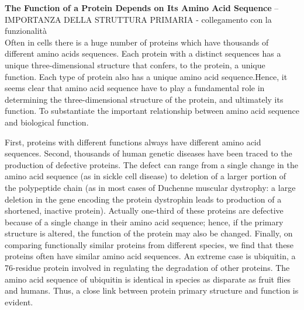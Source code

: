 \textbf{The Function of a Protein Depends on Its Amino Acid Sequence} -- IMPORTANZA DELLA STRUTTURA PRIMARIA - collegamento con la funzionalità\\
Often in cells there is a huge number of proteins which have thousands of different amino acids sequences. Each protein with a distinct sequences has a unique three-dimensional structure that confers, to the protein, a unique function. Each type of protein also has a unique amino acid sequence.Hence, it seems clear that amino acid sequence have to play a fundamental role in determining the three-dimensional structure of the protein, and ultimately its function. To substantiate the important relationship between amino acid sequence and biological function. 

First, proteins with different functions always have different amino acid sequences. 
Second, thousands of human genetic diseases have been traced to the production of defective proteins. The defect can range from a single change in the amino acid sequence (as in sickle cell disease) to deletion of a larger portion of the polypeptide chain (as in most cases of Duchenne muscular dystrophy: a large deletion in the gene encoding the protein dystrophin leads to production of a shortened, inactive protein). Actually one-third of these proteins are defective because of a single change in their amino acid sequence; hence, if the primary structure is altered, the function of the protein may also be changed. 
Finally, on comparing functionally similar proteins from different species, we find that these proteins often have similar amino acid sequences. An extreme case is ubiquitin, a 76-residue protein involved in regulating the degradation of other proteins. The amino acid sequence of ubiquitin is identical in species as disparate as fruit flies and humans.
Thus, a close link between protein primary structure and function is evident.


